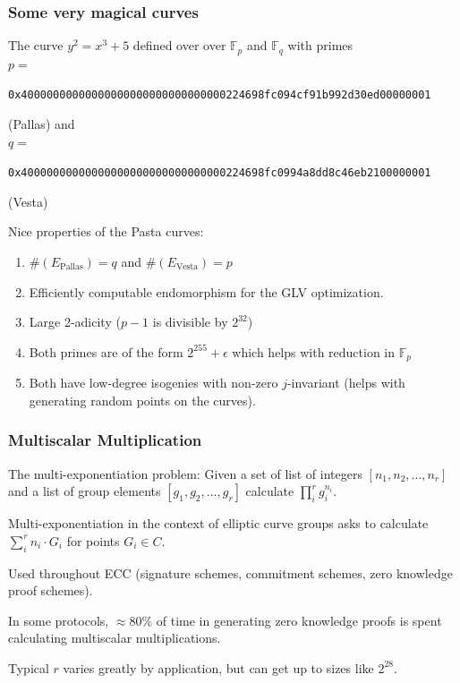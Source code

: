\documentclass[options]{beamer}
\begin{document}
\begin{frame}[fragile]
    \frametitle{Some very magical curves}
    
    The curve $y^2 = x^3 + 5$ defined over over $\mathbb{F}_p$ and $\mathbb{F}_q$ with primes \\ $p = $ 
    \begin{small}\verb+0x40000000000000000000000000000000224698fc094cf91b992d30ed00000001+\end{small}
    (Pallas)
    and \\ $q = $
    \begin{small}\verb+0x40000000000000000000000000000000224698fc0994a8dd8c46eb2100000001+\end{small}
    (Vesta) 

    \vspace{6pt}
    \pause

    Nice properties of the Pasta curves:
    \begin{enumerate}
        \item $\#(E_{\text{Pallas}}) = q$ and $\#(E_{\text{Vesta}}) = p$
        \item Efficiently computable endomorphism for the GLV optimization.
        \item Large 2-adicity ($p-1$ is divisible by $2^{32}$)
        \item Both primes are of the form $2^{255} + \epsilon$ which helps with reduction in $\mathbb F_p$
        \item Both have low-degree isogenies with non-zero $j$-invariant (helps with generating random points on the curves).
    \end{enumerate}

\end{frame}

\begin{frame}
    \frametitle{Multiscalar Multiplication}

    The multi-exponentiation problem: Given a set of list of integers $[n_1, n_2, \ldots, n_r]$ and a list of group elements $[g_1, g_2, \ldots, g_r]$ calculate $\prod_i^r g_i^{n_i}$.

    Multi-exponentiation in the context of elliptic curve groups asks to calculate $\sum_i^r n_i \cdot G_i$ for points $G_i \in C$. 

    \vspace{10pt}
    \pause

    Used throughout ECC (signature schemes, commitment schemes, zero knowledge proof schemes). 

    In some protocols, $\approx 80\%$ of time in generating zero knowledge proofs is spent calculating multiscalar multiplications.

    \vspace{6pt}

    Typical $r$ varies greatly by application, but can get up to sizes like $2^{28}$.
\end{frame}
\end{document}
